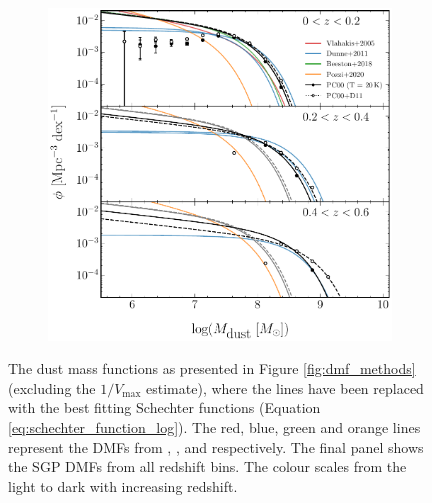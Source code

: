 \begin{figure}
	\centering
    \begin{subfigure}{\textwidth}
	\includegraphics[width=\columnwidth]{Figures/dmf_schechter_part1.pdf}
    \end{subfigure}
    \caption[Schechter functions derived from the SGP DMFs alongside relevant studies]{The dust mass functions as presented in Figure \ref{fig:dmf_methods} (excluding the $1/V_{\textrm{max}}$ estimate), where the lines have been replaced with the best fitting Schechter functions (Equation \ref{eq:schechter_function_log}). The red, blue, green and orange lines represent the DMFs from \citealt{Vlahakis_2005}, \citealt{Dunne_2011}, \citealt{Beeston_2018} and \citealt{Pozzi_2020} respectively. The final panel shows the SGP DMFs from all redshift bins. The colour scales from the light to dark with increasing redshift.}
	\label{fig:dmf_schechter}
\end{figure}

